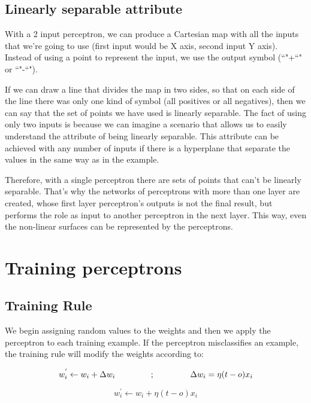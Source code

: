 \documentclass{article}
\begin{document}
	\subsection{Linearly separable attribute}
	With a 2 input perceptron, we can produce a Cartesian map with all the inputs that we're going to use (first input would be X axis, second input Y axis). Instead of using a point to represent the input, we use the output symbol (``"+``" or ``"-``").

	If we can draw a line that divides the map in two sides, so that on each side of the line there was only one kind of symbol (all positives or all negatives), then we can say that the set of points we have used is linearly separable. The fact of using only two inputs is because we can imagine a scenario that allows us to easily understand the attribute of being linearly separable. This attribute can be achieved with any number of inputs if there is a hyperplane that separate the values in the same way as in the example.
	
	Therefore, with a single perceptron there are sets of points that can't be linearly separable. That's why the networks of perceptrons with more than one layer are created, whose first layer perceptron's outputs is not the final result, but performs the role as input to another perceptron in the next layer. This way, even the non-linear surfaces can be represented by the perceptrons.

\section{Training perceptrons}
	\subsection{Training Rule}
	We begin assigning random values to the weights and then we apply the perceptron to each training example. If the perceptron misclassifies an example, the training rule will modify the weights according to:

	\begin{equation*}
		\label{training_rule_proccess}
		w_{i}^{'} \leftarrow w_{i} + \Delta w_{i} \hspace{1.5cm} ; \hspace{1.5cm} \Delta w_{i}= \eta (t - o) x_{i}
	\end{equation*}
	
	\begin{equation}
		\label{training_rule}
		w_{i}^{'} \leftarrow w_{i} + \eta (t - o) x_{i}
	\end{equation}
\end{document}
